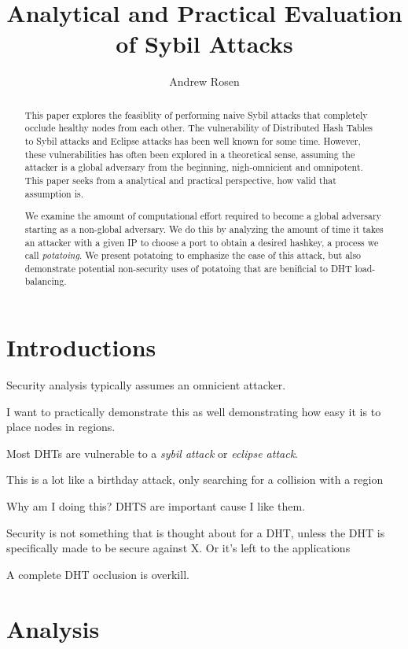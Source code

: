 \documentclass[10pt,a4paper]{article}
\author{Andrew Rosen}
\title{Analytical and Practical Evaluation of Sybil Attacks}
\begin{document}
\maketitle

\begin{abstract}
This paper explores the feasiblity of performing naive Sybil attacks that completely occlude healthy nodes from each other.
The vulnerability of Distributed Hash Tables to Sybil attacks and Eclipse attacks has been well known for some time.
However, these vulnerabilities has often been explored in a theoretical sense, assuming the attacker is a global adversary from the beginning, nigh-omnicient and omnipotent. 
This paper seeks from a analytical and practical perspective, how valid that assumption is.

We examine the amount of computational effort required to become a global adversary starting as a non-global adversary.
We do this by analyzing the amount of time it takes an attacker with a given IP to choose a port to obtain a desired hashkey, a process we call \emph{potatoing}.
We present potatoing to emphasize the ease of this attack, but also demonstrate potential non-security uses of potatoing that are benificial to DHT load-balancing. 
\end{abstract}

\section{Introductions}
Security analysis typically assumes an omnicient attacker. 

I want to practically demonstrate this as well demonstrating how easy it is to place nodes in regions.

Most DHTs are vulnerable to a \textit{sybil attack} or \textit{eclipse attack}.


This is a lot like a birthday attack, only searching for a collision with a region


Why am I doing this?
DHTS are important cause I like them.

Security is not something that is thought about for a DHT, unless the 
DHT is specifically made to be secure against X.  
Or it's left to the applications


A complete DHT occlusion is overkill.
\section{Analysis}

\cite{bellare2004hash}
\end{document}
